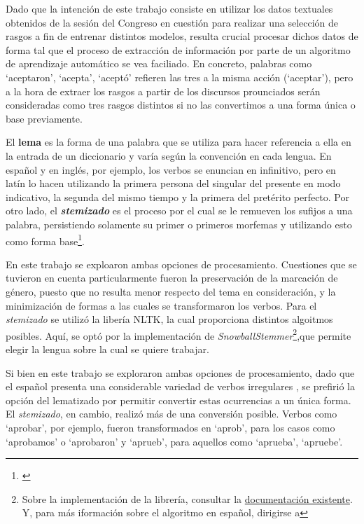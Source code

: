Dado que la intención de este trabajo consiste en utilizar los datos textuales
obtenidos de la sesión del Congreso en cuestión para realizar una selección
de rasgos a fin de entrenar distintos modelos, resulta crucial procesar dichos
datos de forma tal que el proceso de extracción de información por parte
de un algoritmo de aprendizaje automático se vea faciliado. En concreto, palabras
como `aceptaron', `acepta', `aceptó' refieren las tres a la misma acción (`aceptar'),
pero a la hora de extraer los rasgos a partir de los discursos prounciados serán
consideradas como tres rasgos distintos si no las convertimos a una forma única o
base previamente.
\par
El \textbf{lema} es la forma de una palabra que se utiliza para hacer referencia a ella
en la entrada de un diccionario y varía según la convención en cada lengua. En español
y en inglés, por ejemplo, los verbos se enuncian en infinitivo, pero en latín lo hacen
utilizando la primera persona del singular del presente en modo indicativo, la segunda
del mismo tiempo y la primera del pretérito perfecto. Por otro lado, el
\textbf{\textit{stemizado}} es el proceso por el cual se le remueven los sufijos
a una palabra, persistiendo solamente su primer o primeros morfemas y utilizando
esto como forma base\footnote{\citet[Capítulo~3]{bird2009natural}}.
\par
En este trabajo se exploaron ambas opciones de procesamiento. Cuestiones que se tuvieron
en cuenta particularmente fueron la preservación de la marcación de género, puesto que
no resulta menor respecto del tema en consideración, y la minimización de formas a las
cuales se transformaron los verbos. Para el \textit{stemizado} se utilizó la
libería NLTK, la cual proporciona distintos algoitmos posibles. Aquí, se optó por la
implementación de \textit{SnowballStemmer}\footnote{Sobre la implementación de la
librería, consultar la
\href{https://www.nltk.org/api/nltk.stem.SnowballStemmer.html}{documentación existente}.
Y, para más iformación sobre el algoritmo en español, dirigirse a},que permite elegir la lengua sobre la cual
se quiere trabajar.

Si bien en este trabajo se exploraron ambas opciones de procesamiento, dado que el
español presenta una considerable variedad de verbos irregulares
, se prefirió la
opción del lematizado por permitir convertir estas ocurrencias a un única forma.
El \textit{stemizado}, en cambio, realizó más de una conversión posible. Verbos
como `aprobar', por ejemplo, fueron transformados en `aprob', para los casos como
`aprobamos' o `aprobaron' y `aprueb', para aquellos como `aprueba', `apruebe'.
\par